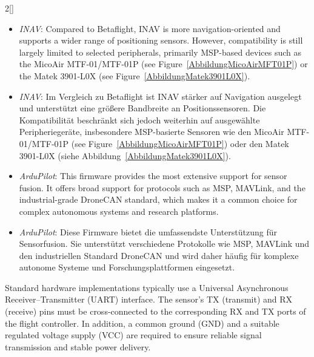\begin{paracol}{2}[]
\coleng

\begin{itemize}
\item \textsl{INAV}: Compared to Betaflight, INAV is more navigation-oriented and supports a wider range of positioning sensors. However, compatibility is still largely limited to selected peripherals, primarily MSP-based devices such as the MicoAir MTF-01/MTF-01P (see Figure~\ref{AbbildungMicoAirMFT01P}) or the Matek 3901-L0X (see Figure~\ref{AbbildungMatek3901L0X}).
\end{itemize}

\colger

\begin{itemize}
\item \textsl{INAV}: Im Vergleich zu Betaflight ist INAV stärker auf Navigation ausgelegt und unterstützt eine größere Bandbreite an Positionssensoren. Die Kompatibilität beschränkt sich jedoch weiterhin auf ausgewählte Peripheriegeräte, insbesondere MSP-basierte Sensoren wie den MicoAir MTF-01/MTF-01P (see Figure~\ref{AbbildungMicoAirMFT01P}) oder den Matek 3901-L0X (siehe Abbildung~\ref{AbbildungMatek3901L0X}).
\end{itemize}


\coleng

\begin{itemize}
\item \textsl{ArduPilot}: This firmware provides the most extensive support for sensor fusion. It offers broad support for protocols such as MSP, MAVLink, and the industrial-grade DroneCAN standard, which makes it a common choice for complex autonomous systems and research platforms.
\end{itemize}

\colger

\begin{itemize}
\item \textsl{ArduPilot}: Diese Firmware bietet die umfassendste Unterstützung für Sensorfusion. Sie unterstützt verschiedene Protokolle wie MSP, MAVLink und den industriellen Standard DroneCAN und wird daher häufig für komplexe autonome Systeme und Forschungsplattformen eingesetzt.
\end{itemize}

\coleng

Standard hardware implementations typically use a Universal Asynchronous Receiver–Transmitter (UART) interface. The sensor’s TX (transmit) and RX (receive) pins must be cross-connected to the corresponding RX and TX ports of the flight controller. In addition, a common ground (GND) and a suitable regulated voltage supply (VCC) are required to ensure reliable signal transmission and stable power delivery.


\end{paracol}
